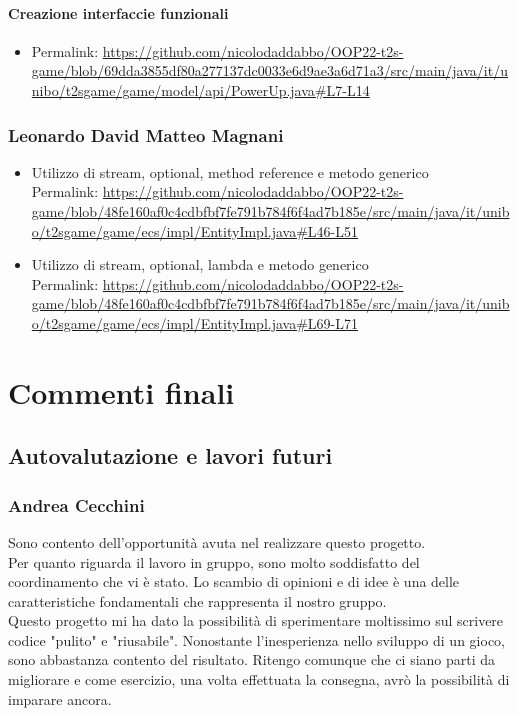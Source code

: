 \documentclass[a4paper,12pt]{report}
\begin{document}
\subsubsection*{Creazione interfaccie funzionali}
\begin{itemize}
    \item Permalink: \url{https://github.com/nicolodaddabbo/OOP22-t2s-game/blob/69dda3855df80a277137dc0033e6d9ae3a6d71a3/src/main/java/it/unibo/t2sgame/game/model/api/PowerUp.java#L7-L14}
\end{itemize}

\subsection*{Leonardo David Matteo Magnani}
\begin{itemize}
	\item Utilizzo di stream, optional, method reference e metodo generico  \\
	Permalink: \url{https://github.com/nicolodaddabbo/OOP22-t2s-game/blob/48fe160af0c4cdbfbf7fe791b784f6f4ad7b185e/src/main/java/it/unibo/t2sgame/game/ecs/impl/EntityImpl.java#L46-L51}
	\item Utilizzo di stream, optional, lambda e metodo generico \\
	Permalink: \url{https://github.com/nicolodaddabbo/OOP22-t2s-game/blob/48fe160af0c4cdbfbf7fe791b784f6f4ad7b185e/src/main/java/it/unibo/t2sgame/game/ecs/impl/EntityImpl.java#L69-L71}
\end{itemize}

\chapter{Commenti finali}

\section{Autovalutazione e lavori futuri}
\subsection*{Andrea Cecchini}
Sono  contento dell'opportunità avuta nel realizzare questo progetto.
\\
Per quanto riguarda il lavoro in gruppo, sono molto soddisfatto del coordinamento che vi è stato.
Lo scambio di opinioni e di idee è una delle caratteristiche fondamentali che rappresenta il nostro gruppo.
\\
Questo progetto mi ha dato la possibilità di sperimentare moltissimo sul scrivere codice "pulito" e "riusabile".
Nonostante l'inesperienza nello sviluppo di un gioco, sono abbastanza contento del risultato.
Ritengo comunque che ci siano parti da migliorare e come esercizio, una volta effettuata la consegna, avrò la possibilità di imparare ancora.
\end{document}
